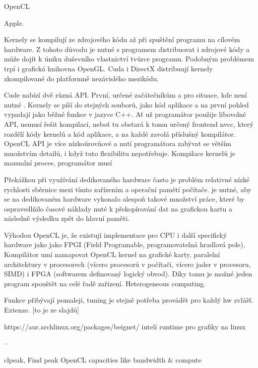 \documentclass[10pt,draft,oneside]{fithesis2}
\begin{document}
OpenCL

Apple.

Kernely se kompilují ze zdrojového kódu až při spuštění programu na cílovém hardware. Z tohoto důvodu je nutné s programem distribuovat i zdrojové kódy a může dojít k úniku duševního vlastnictví tvůrce programu. Podobným problémem trpí i grafická knihovna OpenGL. Cuda i DirectX distribuují kernely zkompilované do platformně nezávislého mezikódu.

Cude nabízí dvě různá API. První, určené začátečníkům a pro situace, kde není nutné . Kernely se píší do stejných souborů, jako kód aplikace a na první pohled vypadají jako běžné funkce v jazyce C++. Ať už programátor použije libovolné API, nemusí řešit kompilaci, neboť tu obstará k tomu určený frontend nvcc, který rozdělí kódy kernelů a kód aplikace, a na každé zavolá příslušný kompilátor. OpenCL API je více nízkoúrovňové a nutí programátora zabývat se větším množstvím detailů, i když tuto flexibilitu nepotřebuje. Kompilace kernelů je manualní proces, programátor musí 

Překážkou při využívání dedikovaného hardware často je problém relativné nízké rychlosti sběrnice mezi tímto zařízením a operační pamětí počítače. je nutné, aby se na dedikovaném hardware vykonalo alespoň takové množství práce, které by ospravedlňilo časové náklady nuté k překopírování dat na grafickou kartu a následně výsledku zpět do hlavní paměti.

Výhodou OpenCL je, že existují implementace pro CPU i další specifický hardware jako jako FPGI (Field Programable, programovatelná hradlová pole). Kompilátor umí namapovat OpenCL kernel na grafické karty, paralelní architektury v procesorech (vícero procesorů v počítači, vícero jader v procesoru, SIMD) i FPGA (softwarem definovaný logický obvod). Díky tomu je možné jeden program spouštět na celé řadě zařízení. Heterogeneous computing.

Funkce přibývají pomaleji, tuning je stejně potřeba provádět pro každý hw zvlášť. Extenze. [to je ze slajdů]

https://aur.archlinux.org/packages/beignet/ intelí runtime pro grafiky na linux

--%



clpeak, Find peak OpenCL capacities like bandwidth \& compute 
\end{document}
